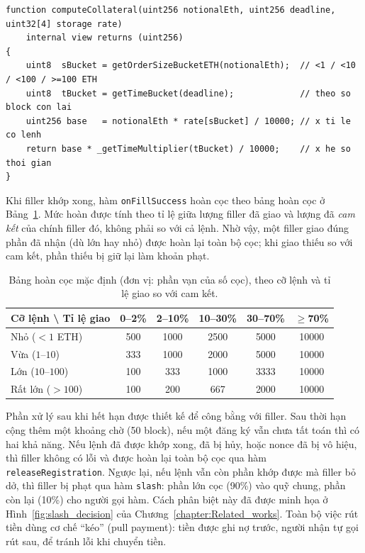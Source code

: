 \documentclass[../DoAn.tex]{subfiles}
\begin{document}
\begin{lstlisting}[caption={Tính cọc động theo cỡ lệnh và thời gian (DynamicStakeLib).}]
function computeCollateral(uint256 notionalEth, uint256 deadline, uint32[4] storage rate)
    internal view returns (uint256)
{
    uint8  sBucket = getOrderSizeBucketETH(notionalEth);  // <1 / <10 / <100 / >=100 ETH
    uint8  tBucket = getTimeBucket(deadline);             // theo so block con lai
    uint256 base   = notionalEth * rate[sBucket] / 10000; // x ti le co lenh
    return base * _getTimeMultiplier(tBucket) / 10000;    // x he so thoi gian
}
\end{lstlisting}

Khi filler khớp xong, hàm \texttt{onFillSuccess} hoàn cọc theo bảng hoàn cọc ở Bảng~\ref{table:refund}. Mức hoàn được tính theo tỉ lệ giữa lượng filler đã giao và lượng đã \emph{cam kết} của chính filler đó, không phải so với cả lệnh. Nhờ vậy, một filler giao đúng phần đã nhận (dù lớn hay nhỏ) được hoàn lại toàn bộ cọc; khi giao thiếu so với cam kết, phần thiếu bị giữ lại làm khoản phạt.

\begin{table}[H]
    \centering
    \caption{Bảng hoàn cọc mặc định (đơn vị: phần vạn của số cọc), theo cỡ lệnh và tỉ lệ giao so với cam kết.}
    \label{table:refund}
    \begin{tabular}{|l|c|c|c|c|c|}
        \hline
        \textbf{Cỡ lệnh \textbackslash{} Tỉ lệ giao} & \textbf{0--2\%} & \textbf{2--10\%} & \textbf{10--30\%} & \textbf{30--70\%} & \textbf{$\geq$70\%} \\
        \hline
        Nhỏ ($<1$ ETH)     & 500 & 1000 & 2500 & 5000 & 10000 \\
        \hline
        Vừa ($1$--$10$)    & 333 & 1000 & 2000 & 5000 & 10000 \\
        \hline
        Lớn ($10$--$100$)  & 100 & 333  & 1000 & 3333 & 10000 \\
        \hline
        Rất lớn ($>100$)   & 100 & 200  & 667  & 2000 & 10000 \\
        \hline
    \end{tabular}
\end{table}

Phần xử lý sau khi hết hạn được thiết kế để công bằng với filler. Sau thời hạn cộng thêm một khoảng chờ (50 block), nếu một đăng ký vẫn chưa tất toán thì có hai khả năng. Nếu lệnh đã được khớp xong, đã bị hủy, hoặc nonce đã bị vô hiệu, thì filler không có lỗi và được hoàn lại toàn bộ cọc qua hàm \texttt{releaseRegistration}. Ngược lại, nếu lệnh vẫn còn phần khớp được mà filler bỏ dở, thì filler bị phạt qua hàm \texttt{slash}: phần lớn cọc (90\%) vào quỹ chung, phần còn lại (10\%) cho người gọi hàm. Cách phân biệt này đã được minh họa ở Hình~\ref{fig:slash_decision} của Chương~\ref{chapter:Related_works}. Toàn bộ việc rút tiền dùng cơ chế ``kéo'' (pull payment): tiền được ghi nợ trước, người nhận tự gọi rút sau, để tránh lỗi khi chuyển tiền.
\end{document}
